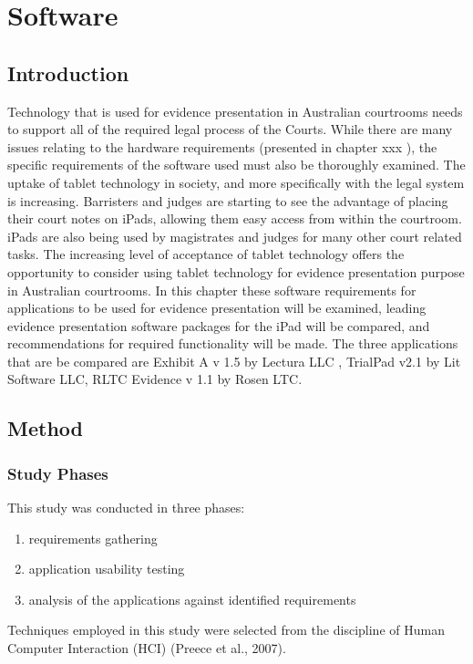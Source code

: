 


\chapter{Software }




\section{Introduction}
\doublespace
Technology that is used for evidence presentation in Australian courtrooms needs to support all of the required legal process of the Courts. While there are many issues relating to the hardware requirements (presented in chapter
\color{red} xxx 
\color{black} ), the specific requirements of the software used must also be thoroughly examined. The uptake of tablet technology in society, and more specifically with the legal system is increasing.
Barristers and judges are starting to see the advantage of placing their court notes on iPads, allowing them easy access from within the courtroom. iPads are also being used by magistrates and judges for many other court related tasks. The increasing level of acceptance of tablet technology offers the opportunity to consider using tablet technology for evidence presentation purpose in Australian courtrooms.
In this chapter these software requirements for applications to be used for evidence presentation will be examined, leading evidence presentation software packages for the iPad will be compared, and recommendations for required functionality will be made.
The three applications that are be compared are Exhibit A v 1.5 by Lectura LLC ,  TrialPad v2.1 by Lit Software LLC, RLTC Evidence v 1.1 by Rosen LTC.


\section{Method}
\subsection{Study Phases}
This study was conducted in three phases:
\begin{enumerate}
    \item requirements gathering
    \item application usability testing
    \item analysis of the applications against identified requirements
\end{enumerate} 
Techniques employed in this study were selected from the discipline of Human Computer Interaction (HCI) \color{green}(Preece et al., 2007).
\color{black}
